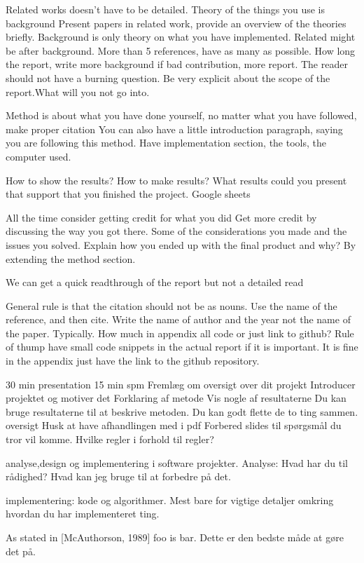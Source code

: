 Related works doesn't have to be detailed.
Theory of the things you use is background
Present papers in related work, provide an overview of the theories briefly.
Background is only theory on what you have implemented.
Related might be after background.
More than 5 references, have as many as possible.
How long the report, write more background if bad contribution, more report.
The reader should not have a burning question.
Be very explicit about the scope of the report.What will you not go into.

Method is about what you have done yourself, no matter what you have followed, make proper citation 
You can also have a little introduction paragraph, saying you are following this method.
Have implementation section, the tools, the computer used.

How to show the results?
How to make results?
What results could you present that support that you finished the project.
Google sheets

All the time consider getting credit for what you did
Get more credit by discussing the way you got there. Some of the considerations you made and the issues you solved.
Explain how you ended up with the final product and why?
By extending the method section.

We can get a quick readthrough of the report but not a detailed read

General rule is that the citation should not be as nouns.
Use the name of the reference, and then cite.
Write the name of author and the year not the name of the paper. Typically.
How much in appendix all code or just link to github?
Rule of thump have small code snippets in the actual report if it is important. It is fine in the appendix just have the link to the github repository.

30 min presentation
15 min spm 
Fremlæg om oversigt over dit projekt
Introducer projektet og motiver det
Forklaring af metode
Vis nogle af resultaterne 
Du kan bruge resultaterne til at beskrive metoden.
Du kan godt flette de to ting sammen.
oversigt
Husk at have afhandlingen med i pdf
Forbered slides til spørgsmål du tror vil komme.
Hvilke regler i forhold til regler? 

analyse,design og implementering i software projekter.
Analyse: Hvad har du til rådighed?
Hvad kan jeg bruge til at forbedre på det.

implementering: kode og algorithmer. Mest bare for vigtige detaljer omkring hvordan du har implementeret ting.

As stated in [McAuthorson, 1989] foo is bar. Dette er den bedste måde at gøre det på.


